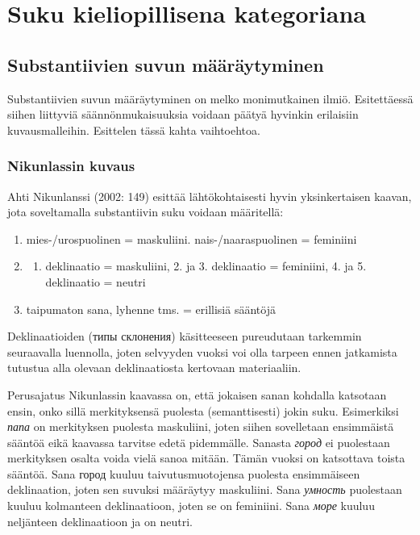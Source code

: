 \documentclass[]{scrreprt}
\providecommand{\tightlist}{%
  \setlength{\itemsep}{0pt}\setlength{\parskip}{0pt}}
\begin{document}
\section{Suku kieliopillisena
kategoriana}\label{suku-kieliopillisena-kategoriana}

\subsection{Substantiivien suvun
määräytyminen}\label{substantiivien-suvun-muxe4uxe4ruxe4ytyminen}

Substantiivien suvun määräytyminen on melko monimutkainen ilmiö.
Esitettäessä siihen liittyviä säännönmukaisuuksia voidaan päätyä
hyvinkin erilaisiin kuvausmalleihin. Esittelen tässä kahta vaihtoehtoa.

\subsubsection{Nikunlassin kuvaus}\label{nikunlassin-kuvaus}

Ahti Nikunlanssi (2002: 149) esittää lähtökohtaisesti hyvin
yksinkertaisen kaavan, jota soveltamalla substantiivin suku voidaan
määritellä:

\begin{enumerate}
\def\labelenumi{\arabic{enumi}.}
\item
  mies-/urospuolinen = maskuliini. nais-/naaraspuolinen = feminiini
\item
  \begin{enumerate}
  \def\labelenumii{\arabic{enumii}.}
  \tightlist
  \item
    deklinaatio = maskuliini, 2. ja 3. deklinaatio = feminiini, 4. ja 5.
    deklinaatio = neutri
  \end{enumerate}
\item
  taipumaton sana, lyhenne tms. = erillisiä sääntöjä
\end{enumerate}

Deklinaatioiden (типы склонения) käsitteeseen pureudutaan tarkemmin
seuraavalla luennolla, joten selvyyden vuoksi voi olla tarpeen ennen
jatkamista tutustua alla olevaan deklinaatiosta kertovaan materiaaliin.

Perusajatus Nikunlassin kaavassa on, että jokaisen sanan kohdalla
katsotaan ensin, onko sillä merkityksensä puolesta (semanttisesti) jokin
suku. Esimerkiksi \emph{папа} on merkityksen puolesta maskuliini, joten
siihen sovelletaan ensimmäistä sääntöä eikä kaavassa tarvitse edetä
pidemmälle. Sanasta \emph{город} ei puolestaan merkityksen osalta voida
vielä sanoa mitään. Tämän vuoksi on katsottava toista sääntöä. Sana
город kuuluu taivutusmuotojensa puolesta ensimmäiseen deklinaation,
joten sen suvuksi määräytyy maskuliini. Sana \emph{умность} puolestaan
kuuluu kolmanteen deklinaatioon, joten se on feminiini. Sana \emph{море}
kuuluu neljänteen deklinaatioon ja on neutri.
\end{document}
